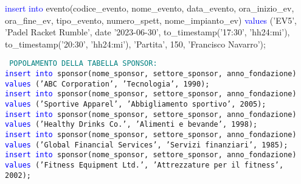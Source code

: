 \documentclass{article}
\begin{document}
\begin{flushleft}
{        \vspace{2mm}
        \hspace*{0.5em}\textcolor{blue}{insert into} evento(codice\_evento, nome\_evento, data\_evento, ora\_inizio\_ev, \hspace*{0.5em}ora\_fine\_ev, tipo\_evento, numero\_spett, nome\_impianto\_ev) \textcolor{blue}{values} ('EV5', 'Padel \hspace*{0.5em}Racket Rumble', date '2023-06-30', to\_timestamp('17:30', 'hh24:mi'), \hspace*{0.5em}to\_timestamp('20:30', 'hh24:mi'), 'Partita', 150, 'Francisco Navarro'); \\}
    \end{flushleft}

    \begin{flushleft}
        \texttt{
        \textcolor{teal}{POPOLAMENTO DELLA TABELLA SPONSOR:} \\
        \hspace*{0.5em}\textcolor{blue}{insert into} sponsor(nome\_sponsor, settore\_sponsor, anno\_fondazione) \textcolor{blue}{values} ('ABC \hspace*{0.5em}Corporation', 'Tecnologia', 1990); \\
        \hspace*{0.5em}\textcolor{blue}{insert into} sponsor(nome\_sponsor, settore\_sponsor, anno\_fondazione) \textcolor{blue}{values} \hspace*{0.5em}('Sportive Apparel', 'Abbigliamento sportivo', 2005); \\
        \hspace*{0.5em}\textcolor{blue}{insert into} sponsor(nome\_sponsor, settore\_sponsor, anno\_fondazione) \textcolor{blue}{values} \hspace*{0.5em}('Healthy Drinks Co.', 'Alimenti e bevande', 1998); \\
        \hspace*{0.5em}\textcolor{blue}{insert into} sponsor(nome\_sponsor, settore\_sponsor, anno\_fondazione) \textcolor{blue}{values} \hspace*{0.5em}('Global Financial Services', 'Servizi finanziari', 1985); \\
        \hspace*{0.5em}\textcolor{blue}{insert into} sponsor(nome\_sponsor, settore\_sponsor, anno\_fondazione) \textcolor{blue}{values} \hspace*{0.5em}('Fitness Equipment Ltd.', 'Attrezzature per il fitness', 2002); \\}
    \end{flushleft}
\end{document}
